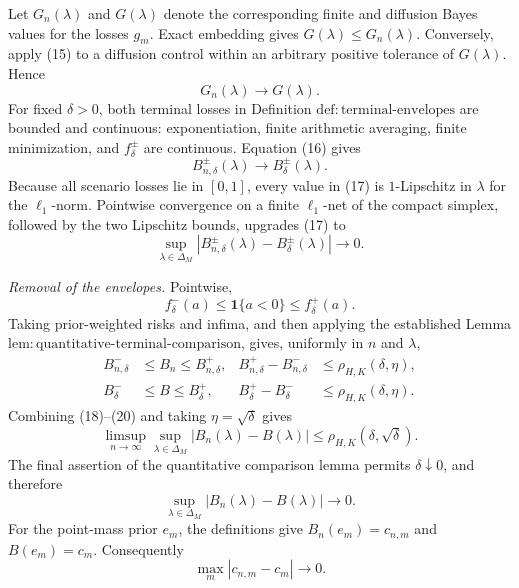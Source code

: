 Let \(G_n(\lambda)\) and \(G(\lambda)\) denote the corresponding finite and diffusion Bayes values for the losses \(g_m\).  Exact embedding gives \(G(\lambda)\leq G_n(\lambda)\).  Conversely, apply (15) to a diffusion control within an arbitrary positive tolerance of \(G(\lambda)\).  Hence
\[
 G_n(\lambda)\longrightarrow G(\lambda).                        \tag{16}
\]
For fixed \(\delta>0\), both terminal losses in Definition \(\mathrm{def{:}terminal\text{-}envelopes}\) are bounded and continuous: exponentiation, finite arithmetic averaging, finite minimization, and \(f_\delta^\pm\) are continuous.  Equation (16) gives
\[
 B_{n,\delta}^{\pm}(\lambda)\longrightarrow B_\delta^{\pm}(\lambda). \tag{17}
\]
Because all scenario losses lie in \([0,1]\), every value in (17) is \(1\)-Lipschitz in \(\lambda\) for the \(\ell_1\)-norm.  Pointwise convergence on a finite \(\ell_1\)-net of the compact simplex, followed by the two Lipschitz bounds, upgrades (17) to
\[
 \sup_{\lambda\in\Delta_M}
 |B_{n,\delta}^{\pm}(\lambda)-B_\delta^{\pm}(\lambda)|
 \longrightarrow0.                                               \tag{18}
\]

\emph{Removal of the envelopes.}  Pointwise,
\[
 f_\delta^-(a)\leq\mathbf 1\{a<0\}\leq f_\delta^+(a).          \tag{19}
\]
Taking prior-weighted risks and infima, and then applying the established Lemma \(\mathrm{lem{:}quantitative\text{-}terminal\text{-}comparison}\), gives, uniformly in \(n\) and \(\lambda\),
\[
 \begin{aligned}
 B_{n,\delta}^-&\leq B_n\leq B_{n,\delta}^+,
 &B_{n,\delta}^+-B_{n,\delta}^-&\leq\rho_{H,K}(\delta,\eta),\\
 B_\delta^-&\leq B\leq B_\delta^+,
 &B_\delta^+-B_\delta^-&\leq\rho_{H,K}(\delta,\eta).
 \end{aligned}                                                     \tag{20}
\]
Combining (18)--(20) and taking \(\eta=\sqrt\delta\) gives
\[
 \limsup_{n\to\infty}\sup_{\lambda\in\Delta_M}|B_n(\lambda)-B(\lambda)|
 \leq\rho_{H,K}(\delta,\sqrt\delta).                            \tag{21}
\]
The final assertion of the quantitative comparison lemma permits \(\delta\downarrow0\), and therefore
\[
 \sup_{\lambda\in\Delta_M}|B_n(\lambda)-B(\lambda)|\longrightarrow0. \tag{22}
\]
For the point-mass prior \(e_m\), the definitions give \(B_n(e_m)=c_{n,m}\) and \(B(e_m)=c_m\).  Consequently
\[
 \max_m|c_{n,m}-c_m|\longrightarrow0.                            \tag{23}
\]

